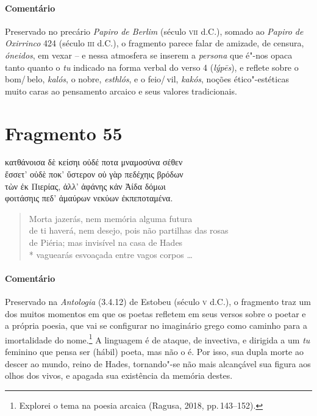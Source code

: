 \medskip

\paragraph{Comentário}
Preservado no precário \textit{Papiro de Berlim} (século \textsc{vii} d.C.), somado ao \textit{Papiro de Oxirrinco} 424 (século \textsc{iii} d.C.), o fragmento parece falar de amizade, de censura, \textit{óneidos}, em vexar -- e nessa atmosfera se inserem a \textit{persona} que é"-nos opaca tanto quanto o \textit{tu} indicado na  forma verbal do verso 4 (\textit{lýpēs}), e reflete sobre o bom/\,belo, \textit{kalós}, o nobre, \textit{esthlós}, e o feio/\,vil, \textit{kakós}, noções ético"-estéticas muito caras ao pensamento arcaico e seus valores tradicionais.


\pagebreak
\section{Fragmento 55}

\begin{gkverse}
κατθάνοισα δὲ κείσηι οὐδέ ποτα μναμοσύνα σέθεν\\
ἔσσετ’ οὐδὲ \dagger{}ποκ’\dagger{} ὔστερον οὐ γὰρ πεδέχηις βρόδων\\
τὼν ἐκ Πιερίας, ἀλλ’ ἀφάνης κἀν Ἀίδα δόμωι\\
φοιτάσηις πεδ’ ἀμαύρων νεκύων ἐκπεποταμένα.
\end{gkverse}

\begin{verse}
Morta jazerás, nem memória alguma futura\\
de ti haverá, nem desejo, pois não partilhas das rosas\\
de Piéria; mas invisível na casa de Hades\\*
vaguearás esvoaçada entre vagos corpos \ldots{}
\end{verse}

\medskip

{\paragraph{Comentário} Preservado na \textit{Antologia} (3.4.12) de Estobeu (século \textsc{v} d.C.), o fragmento traz um dos muitos momentos em que os poetas refletem em seus versos
sobre o poetar e a própria poesia, que vai se configurar no imaginário grego
como caminho para a imortalidade do nome.\footnote{Explorei o tema na poesia arcaica (Ragusa, 2018, pp.\,143--152).} A linguagem é de ataque, de
invectiva, e dirigida a um \textit{tu} feminino que pensa ser (hábil) poeta, mas
não o é. Por isso, sua dupla morte ao descer ao mundo, reino de
Hades, tornando"-se não mais alcançável sua figura aos olhos dos vivos, e
apagada sua existência da memória destes.}



